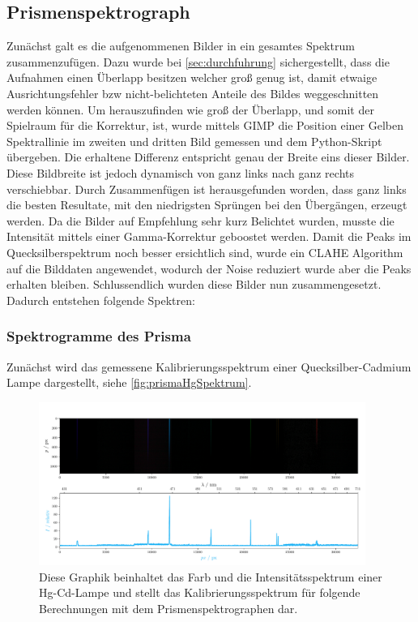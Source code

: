 \documentclass[12pt,english,ngerman]{scrartcl}
\begin{document}
\subsection{Prismenspektrograph}
Zunächst galt es die aufgenommenen Bilder in ein gesamtes Spektrum
zusammenzufügen. Dazu wurde bei \autoref{sec:durchfuhrung} sichergestellt, dass
die Aufnahmen einen Überlapp besitzen welcher groß genug ist, damit etwaige
Ausrichtungsfehler bzw nicht-belichteten Anteile des Bildes weggeschnitten
werden können. Um herauszufinden wie groß der Überlapp, und somit der Spielraum
für die Korrektur, ist, wurde mittels GIMP die Position einer Gelben
Spektrallinie im zweiten und dritten Bild gemessen und dem Python-Skript
übergeben. Die erhaltene Differenz entspricht genau der Breite eins dieser
Bilder. Diese Bildbreite ist jedoch dynamisch von ganz links nach ganz rechts
verschiebbar. Durch Zusammenfügen ist herausgefunden worden, dass ganz links
die besten Resultate, mit den niedrigsten Sprüngen bei den Übergängen, erzeugt
werden. Da die Bilder auf Empfehlung sehr kurz Belichtet wurden, musste die
Intensität mittels einer Gamma-Korrektur geboostet werden. Damit die Peaks im
Quecksilberspektrum noch besser ersichtlich sind, wurde ein CLAHE Algorithm auf
die Bilddaten angewendet, wodurch der Noise reduziert wurde aber die Peaks
erhalten bleiben. Schlussendlich wurden diese Bilder nun zusammengesetzt.
Dadurch entstehen folgende Spektren:

\subsubsection{Spektrogramme des Prisma}
Zunächst wird das gemessene Kalibrierungsspektrum einer Quecksilber-Cadmium
Lampe dargestellt, siehe \autoref{fig:prismaHgSpektrum}.

\begin{figure}[H]
	\begin{center}
		\includegraphics[width=0.95\textwidth]{figures/Hg_plot.pdf}
	\end{center}
	\caption{
		Diese Graphik beinhaltet das Farb und die Intensitätsspektrum einer
		Hg-Cd-Lampe und stellt das Kalibrierungsspektrum für folgende 
		Berechnungen mit dem Prismenspektrographen dar. 
	}\label{fig:prismaHgSpektrum}
\end{figure}
\end{document}
